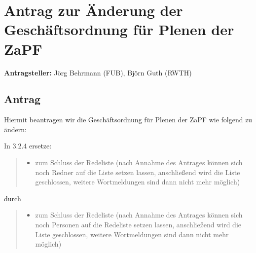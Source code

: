 \documentclass[draft,10pt,oneside]{scrartcl}
\begin{document}
\section*{Antrag zur Änderung der Geschäftsordnung für Plenen der ZaPF}

\textbf{Antragsteller:} Jörg Behrmann (FUB), Björn Guth (RWTH)

\subsection*{Antrag}

Hiermit beantragen wir die Geschäftsordnung für Plenen der ZaPF wie folgend zu
ändern:

In 3.2.4 ersetze:
\begin{quote}
    \begin{itemize}
        \item zum Schluss der Redeliste (nach Annahme des Antrages können sich
            noch Redner auf die Liste setzen lassen, anschließend wird die
            Liste geschlossen, weitere Wortmeldungen sind dann nicht mehr
            möglich)
    \end{itemize}
\end{quote}
durch
\begin{quote}
    \begin{itemize}
        \item zum Schluss der Redeliste (nach Annahme des Antrages können sich
            noch Personen auf die Redeliste setzen lassen, anschließend wird
            die Liste geschlossen, weitere Wortmeldungen sind dann nicht mehr
            möglich)
    \end{itemize}
\end{quote}
\end{document}
